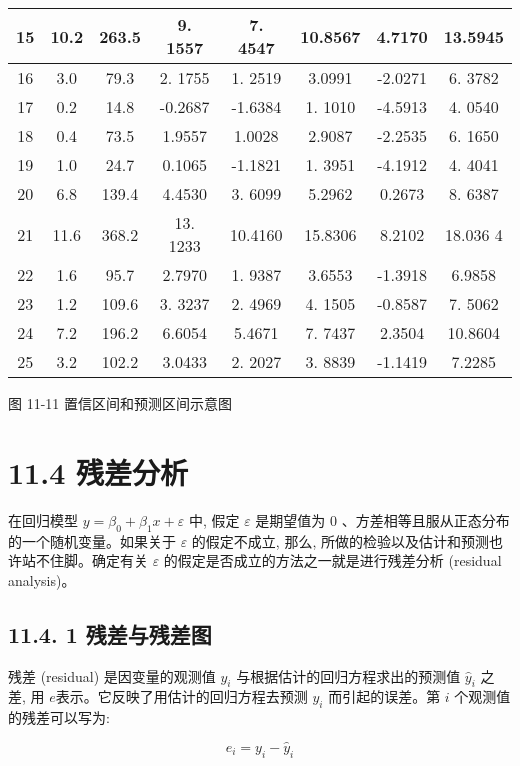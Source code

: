\documentclass[10pt]{article}
\begin{document}
\begin{CJK*}{UTF8}{bsmi}
\begin{center}
\begin{tabular}{|c|c|c|c|c|c|c|c|}
\hline
15 & 10.2 & 263.5 & 9. 1557 & 7. 4547 & 10.8567 & 4.7170 & 13.5945 \\
\hline
16 & 3.0 & 79.3 & 2. 1755 & 1. 2519 & 3.0991 & -2.0271 & 6. 3782 \\
\hline
17 & 0.2 & 14.8 & -0.2687 & -1.6384 & 1. 1010 & -4.5913 & 4. 0540 \\
\hline
18 & 0.4 & 73.5 & 1.9557 & 1.0028 & 2.9087 & -2.2535 & 6. 1650 \\
\hline
19 & 1.0 & 24.7 & 0.1065 & -1.1821 & 1. 3951 & -4.1912 & 4. 4041 \\
\hline
20 & 6.8 & 139.4 & 4.4530 & 3. 6099 & 5.2962 & 0.2673 & 8. 6387 \\
\hline
21 & 11.6 & 368.2 & 13. 1233 & 10.4160 & 15.8306 & 8.2102 & 18.036 4 \\
\hline
22 & 1.6 & 95.7 & 2.7970 & 1. 9387 & 3.6553 & -1.3918 & 6.9858 \\
\hline
23 & 1.2 & 109.6 & 3. 3237 & 2. 4969 & 4. 1505 & -0.8587 & 7. 5062 \\
\hline
24 & 7.2 & 196.2 & 6.6054 & 5.4671 & 7. 7437 & 2.3504 & 10.8604 \\
\hline
25 & 3.2 & 102.2 & 3.0433 & 2. 2027 & 3. 8839 & -1.1419 & 7.2285 \\
\hline
\end{tabular}
\end{center}

\begin{center}
\end{center}

图 11-11 置信区间和预测区间示意图

\section*{11.4 残差分析}
在回归模型 $y=\beta_{0}+\beta_{1} x+\varepsilon$ 中, 假定 $\varepsilon$ 是期望值为 0 、方差相等且服从正态分布的一个随机变量。如果关于 $\varepsilon$ 的假定不成立, 那么, 所做的检验以及估计和预测也许站不住脚。确定有关 $\varepsilon$ 的假定是否成立的方法之一就是进行残差分析 (residual analysis)。

\subsection*{11.4. 1 残差与残差图}
残差 (residual) 是因变量的观测值 $y_{i}$ 与根据估计的回归方程求出的预测值 $\hat{y}_{i}$ 之差, 用 $e$表示。它反映了用估计的回归方程去预测 $y_{i}$ 而引起的误差。第 $i$ 个观测值的残差可以写为:


\begin{equation*}
e_{i}=y_{i}-\hat{y}_{i} \tag{11.26}
\end{equation*}



\end{CJK*}
\end{document}
